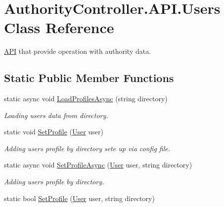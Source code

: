 \hypertarget{class_authority_controller_1_1_a_p_i_1_1_users}{}\section{Authority\+Controller.\+A\+P\+I.\+Users Class Reference}
\label{class_authority_controller_1_1_a_p_i_1_1_users}


\mbox{\hyperlink{namespace_authority_controller_1_1_a_p_i}{A\+PI}} that provide operation with authority data.  


\subsection*{Static Public Member Functions}
\begin{DoxyCompactItemize}
\item 
static async void \mbox{\hyperlink{class_authority_controller_1_1_a_p_i_1_1_users_a5154a7787617e9c51c5519304ec89530}{Load\+Profiles\+Async}} (string directory)
\begin{DoxyCompactList}\small\item\em Loading users data from directory. \end{DoxyCompactList}\item 
static void \mbox{\hyperlink{class_authority_controller_1_1_a_p_i_1_1_users_a5d8242dfe20d058ea78d9f50b3b3c3cd}{Set\+Profile}} (\mbox{\hyperlink{class_authority_controller_1_1_data_1_1_user}{User}} user)
\begin{DoxyCompactList}\small\item\em Adding user\textquotesingle{}s profile by directory sete up via config file. \end{DoxyCompactList}\item 
static async void \mbox{\hyperlink{class_authority_controller_1_1_a_p_i_1_1_users_a3ed2ca9e5bb026c907894da4160b5e5e}{Set\+Profile\+Async}} (\mbox{\hyperlink{class_authority_controller_1_1_data_1_1_user}{User}} user, string directory)
\begin{DoxyCompactList}\small\item\em Adding user\textquotesingle{}s profile by directory. \end{DoxyCompactList}\item 
static bool \mbox{\hyperlink{class_authority_controller_1_1_a_p_i_1_1_users_a6896c020fbcaf19c54962c7c769502e4}{Set\+Profile}} (\mbox{\hyperlink{class_authority_controller_1_1_data_1_1_user}{User}} user, string directory)

\end{DoxyCompactItemize}
